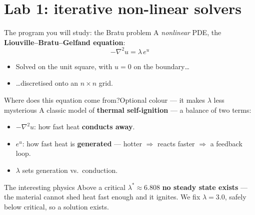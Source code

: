\documentclass[aspectratio=169]{beamer}
\begin{document}
\section{Lab 1: iterative non-linear solvers}

\begin{frame}{The program you will study: the Bratu problem}
  A \emph{nonlinear} PDE, the \textbf{Liouville--Bratu--Gelfand equation}:
  \[
    -\nabla^2 u = \lambda\, e^{u}
  \]
  \begin{itemize}\setlength\itemsep{4pt}
    \item Solved on the unit square, with $u = 0$ on the boundary\ldots
    \item \ldots discretised onto an $n \times n$ grid.
  \end{itemize}
\end{frame}

\begin{frame}{Where does this equation come from?}{Optional colour --- it makes $\lambda$ less mysterious}
  A classic model of \textbf{thermal self-ignition} --- a balance of two terms:
  \begin{itemize}\setlength\itemsep{4pt}
    \item $-\nabla^2 u$: how fast heat \textbf{conducts away}.
    \item $e^{u}$: how fast heat is \textbf{generated}
      --- hotter $\Rightarrow$ reacts faster $\Rightarrow$ a feedback loop.
    \item $\lambda$ sets generation vs.\ conduction.
  \end{itemize}
  \bigskip
  \begin{alertblock}{The interesting physics}
    Above a critical $\lambda^{*} \approx 6.808$ \textbf{no steady state exists} ---
    the material cannot shed heat fast enough and it ignites.
    We fix $\lambda = 3.0$, safely below critical, so a solution exists.
  \end{alertblock}
\end{frame}
\end{document}
